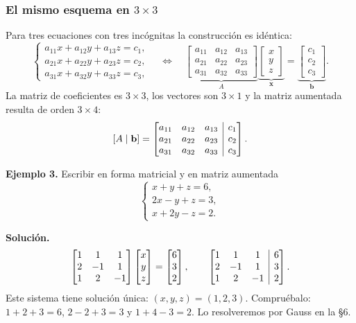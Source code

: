 \documentclass[12pt, letterpaper]{article}
\makeatletter
\newcommand{\mwmat}[1]{\ensuremath{\begin{bmatrix}#1\end{bmatrix}}}
\newcommand{\mwaug}[2]{\ensuremath{\left[\begin{array}{@{}#1@{}}#2\end{array}\right]}}
\makeatother
\begin{document}
\subsubsection*{El mismo esquema en $3\times3$}

Para tres ecuaciones con tres incógnitas la construcción es idéntica:
\[
  \begin{cases}
    a_{11}x+a_{12}y+a_{13}z=c_1,\\
    a_{21}x+a_{22}y+a_{23}z=c_2,\\
    a_{31}x+a_{32}y+a_{33}z=c_3,
  \end{cases}
  \quad\Longleftrightarrow\quad
  \underbrace{\mwmat{a_{11}&a_{12}&a_{13}\\a_{21}&a_{22}&a_{23}\\a_{31}&a_{32}&a_{33}}}_{A}
  \underbrace{\mwmat{x\\y\\z}}_{\mathbf{x}}
  =
  \underbrace{\mwmat{c_1\\c_2\\c_3}}_{\mathbf{b}}.
\]
La matriz de coeficientes es $3\times3$, los vectores son $3\times1$ y la
matriz aumentada resulta de orden $3\times4$:
\[
  \left[A\mid\mathbf{b}\right]=
  \mwaug{ccc|c}{a_{11}&a_{12}&a_{13}&c_1\\
                a_{21}&a_{22}&a_{23}&c_2\\
                a_{31}&a_{32}&a_{33}&c_3}.
\]

\begin{cuadrosolucion}
  \small
  \textbf{Ejemplo 3.} Escribir en forma matricial y en matriz aumentada
  \[
    \begin{cases}
      x+y+z=6,\\
      2x-y+z=3,\\
      x+2y-z=2.
    \end{cases}
  \]

  \medskip
  \textbf{Solución.}
  \[
    \mwmat{1&1&1\\2&-1&1\\1&2&-1}\mwmat{x\\y\\z}=\mwmat{6\\3\\2},
    \qquad
    \mwaug{ccc|c}{1&1&1&6\\2&-1&1&3\\1&2&-1&2}.
  \]
  Este sistema tiene solución única: $(x,y,z)=(1,2,3)$. Compruébalo:
  $1+2+3=6$, $2-2+3=3$ y $1+4-3=2$. Lo resolveremos por Gauss en la §6.
\end{cuadrosolucion}
\end{document}
